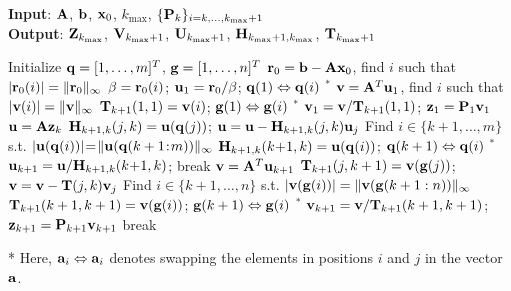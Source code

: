 \documentclass[11pt]{article}
\numberwithin{equation}{section}
\newcommand{\bfA}{{\bf A}}
\newcommand{\bfH}{{\bf H}}
\newcommand{\bfP}{{\bf P}}
\newcommand{\bfT}{{\bf T}}
\newcommand{\bfU}{{\bf U}}
\newcommand{\bfV}{{\bf V}}
\newcommand{\bfZ}{{\bf Z}}
\newcommand{\bfa}{{\bf a}}
\newcommand{\bfb}{{\bf b}}
\newcommand{\bfg}{{\bf g}}
\newcommand{\bfq}{{\bf q}}
\newcommand{\bfr}{{\bf r}}
\newcommand{\bfu}{{\bf u}}
\newcommand{\bfv}{{\bf v}}
\newcommand{\bfx}{{\bf x}}
\newcommand{\bfz}{{\bf z}}
\begin{document}
\begin{algorithm}[ht]
\caption{Flexible generalized Hessenberg process with pivoting} \label{alg:gen_hessenberg}
\hspace*{\algorithmicindent} \textbf{Input}: $\bfA$, $\bfb$, $\bfx_0$, $k_{\max}$, $\{\bfP_{k}\}_{i=k,\dots,k_{\max}+1}$\\
\hspace*{\algorithmicindent} \textbf{Output}: $\bfZ_{k_{\max}}$, $\bfV_{k_{\max}+1}$, $\bfU_{k_{\max}+1}$, $\bfH_{k_{\max}+1,k_{\max}}$, $\bfT_{k_{\max}+1}$
\begin{algorithmic}[1]
\State Initialize $\bfq = [1,\dots,m]^T$, $\bfg = [1,\dots,n]^T $
\State $\bfr_0 = \bfb - \bfA \bfx_0$, find $i$ such that $|\bfr_0(i)| = \|\bfr_0\|_{\infty}$
\State $\beta = \bfr_0(i)$; $\bfu_1 = \bfr_0/ \beta$; $\bfq(1) \Leftrightarrow \bfq(i)$ $^{*}$
\State  $\bfv= \bfA^T \bfu_1$, find $i$ such that $|\bfv(i)| = \|\bfv\|_{\infty}$
\State $\bfT_{k+1}(1,1) = \bfv(i)$; $\bfg(1) \Leftrightarrow \bfg(i)$ $^{*}$
\State $\bfv_{1} = \bfv/\bfT_{k+1}(1,1)$; $\bfz_{1} = \bfP_1 \bfv_1$
    \State $\bfu = \bfA \bfz_k$
        \State $\bfH_{k+1,k}(j,k) = \bfu(\bfq(j))$; $\bfu = \bfu-\bfH_{k+1,k}(j,k)\bfu_j$
    \EndFor
    \If{$k<m$ and $\bfu \neq \bf0$}
        \State Find $i \in \{ k+1,\dots,m\}$ s.t. $|\bfu(\bfq(i))| \hspace{-2pt}= \hspace{-2pt}\|\bfu(\bfq(k+1\hspace{-2pt}:\hspace{-2pt}m))\|_{\infty}$
        \State $\bfH_{k+1,k}(k\hspace{-2pt}+\hspace{-2pt}1,k)=\bfu(\bfq(i))$; $\bfq(k+1) \Leftrightarrow \bfq(i)$ $^{*}$
        \State  $\bfu_{k+1}=\bfu/\bfH_{k+1,k}(k\hspace{-2pt}+\hspace{-2pt}1,k)$;
        \Else
        \State break
    \EndIf   
    \State $\bfv = \bfA^T \bfu_{k+1}$
        \State $\bfT_{k+1}(j,k+1) = \bfv(\bfg(j))$; $\bfv = \bfv - \bfT(j,k) \bfv_j$
    \EndFor
    \If{$k<n$ and $\bfv \neq \bf0$}
        \State Find $i \in \{k+1,\dots,n\}$ s.t. $|\bfv(\bfg(i))| = \|\bfv(\bfg(k+1:n))\|_{\infty}$
        \State $\bfT_{k+1}(k+1,k+1) = \bfv(\bfg(i))$; $\bfg(k+1) \Leftrightarrow \bfg(i)$ $^{*}$
        \State  $\bfv_{k+1} = \bfv/\bfT_{k+1}(k+1,k+1)$; $\bfz_{k+1}=\bfP_{k+1}\bfv_{k+1}$
    \Else
        \State break
    \EndIf 
\EndFor 
\end{algorithmic} 
\vspace{-3pt}
\begin{footnotesize}
* Here, $\bfa_i \Leftrightarrow \bfa_i$ denotes swapping the elements in positions $i$ and $j$ in the vector $\bfa$.
\end{footnotesize}
\end{algorithm}
\end{document}
